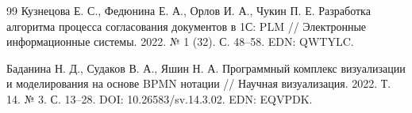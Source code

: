 
\begin{thebibliography}{99}
  Кузнецова Е. С., Федюнина Е. А., Орлов И. А., Чукин П. Е. Разработка алгоритма процесса согласования документов в 1С: PLM // Электронные информационные системы. 2022. № 1 (32). С. 48–58. EDN: QWTYLC.

  Баданина Н. Д., Судаков В. А., Яшин Н. А. Программный комплекс визуализации и моделирования на основе BPMN нотации // Научная визуализация. 2022. Т. 14. № 3. С. 13–28. DOI: 10.26583/sv.14.3.02. EDN: EQVPDK.
\end{thebibliography}

